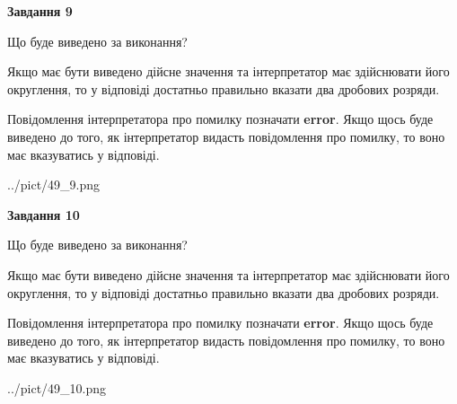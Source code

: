 \documentclass[12pt, ukrainian]{article}
\begin{document}
{\begin {Large}
{\begin {center}\textbf{Завдання 9}\end {center}}\par
Що буде виведено за виконання? \par

Якщо має бути виведено дійсне значення та інтерпретатор має здійснювати його округлення, 
то у відповіді достатньо правильно вказати два дробових розряди.

Повідомлення інтерпретатора про помилку позначати \textbf{error}.
Якщо щось буде виведено до того, як інтерпретатор видасть повідомлення про помилку, 
то воно має вказуватись у відповіді. \par

\begin{center}
	{../pict/49_9.png}
\end{center}
\newpage

{\begin {center}\textbf{Завдання 10}\end {center}}\par
Що буде виведено за виконання? \par

Якщо має бути виведено дійсне значення та інтерпретатор має здійснювати його округлення, 
то у відповіді достатньо правильно вказати два дробових розряди.

Повідомлення інтерпретатора про помилку позначати \textbf{error}.
Якщо щось буде виведено до того, як інтерпретатор видасть повідомлення про помилку, 
то воно має вказуватись у відповіді. \par

\begin{center}
	{../pict/49_10.png}
\end{center}
\newpage

\end {Large}}
\end{document}
